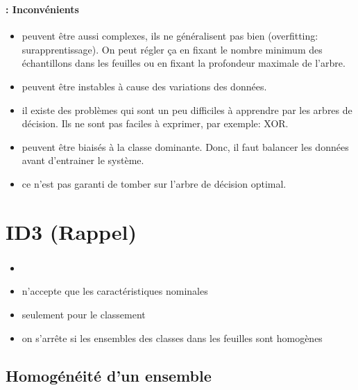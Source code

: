 \documentclass[xcolor=table]{beamer}
\begin{document}
\begin{frame}
	\frametitle{\insertsection}
	\framesubtitle{\insertsubsection: Inconvénients}
	
	\begin{itemize}
		\item peuvent être aussi complexes, ils ne généralisent pas bien (overfitting: surapprentissage). On peut régler ça en fixant le nombre minimum des échantillons dans les feuilles ou en fixant la profondeur maximale de l'arbre.
		\item peuvent être instables à cause des variations des données.
		\item il existe des problèmes qui sont un peu difficiles à apprendre par les arbres de décision. Ils ne sont pas faciles à exprimer, par exemple: XOR.
		\item peuvent être biaisés à la classe dominante. Donc, il faut balancer les données avant d'entrainer le système.
		\item ce n'est pas garanti de tomber sur l'arbre de décision optimal.
	\end{itemize}
	
\end{frame}

\section{ID3 (Rappel)}

\begin{frame}
	\frametitle{\insertsection}
	
	\begin{itemize}
		\item {}
		\item n'accepte que les caractéristiques nominales
		\item seulement pour le classement
		\item on s'arrête si les ensembles des classes dans les feuilles sont homogènes
	\end{itemize}
	
\end{frame}

\subsection{Homogénéité d'un ensemble}
\end{document}
